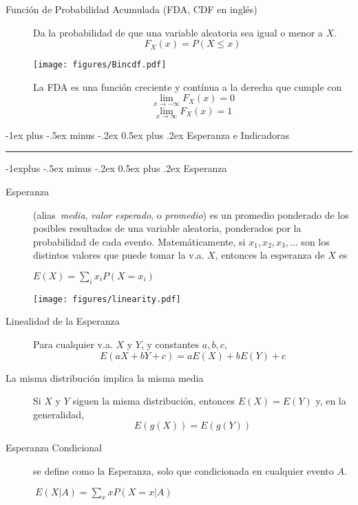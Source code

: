 \documentclass[12,landscape]{article}
\makeatletter
\renewcommand{\section}{\@startsection{section}{1}{0mm}%
                                {-1ex plus -.5ex minus -.2ex}%
                                {0.5ex plus .2ex}%
                                {\normalfont\large\bfseries}}
\renewcommand{\subsection}{\@startsection{subsection}{2}{0mm}%
                                {-1explus -.5ex minus -.2ex}%
                                {0.5ex plus .2ex}%
                                {\normalfont\normalsize\bfseries}}
\makeatother
\begin{document}
\begin{multicols*}{3}
\begin{description}
\item[Función de Probabilidad Acumulada (FDA, CDF en inglés)] 
Da la probabilidad de que una variable aleatoria sea igual o menor a $X.$
\[F_X(x) = P(X \leq x)\]
\begin{minipage}{\linewidth}
            \centering
\texttt{[image: figures/Bincdf.pdf]}
        \end{minipage}

La FDA es una función creciente y contínua a la derecha que cumple con
\[\lim_{x\to -\infty} {F_X(x)} = 0\]
\[\lim_{x \to \infty} F_X(x) = 1\]

\end{description}

\section{Esperanza e Indicadoras}\smallskip \hrule height 2pt \smallskip


\subsection{Esperanza}
\begin{description}
\item[Esperanza] (alias~\emph{media}, \emph{valor esperado}, o \emph{promedio}) es un promedio ponderado de los posibles resultados de una variable aleatoria, ponderados por la probabilidad de cada evento. Matemáticamente, si $x_1, x_2, x_3, \dots$ son los distintos valores que puede tomar la v.a. $X$, entonces la esperanza de $X$ es
\begin{center}
$E(X) = \sum\limits_{i}x_iP(X=x_i)$
\end{center}

\begin{minipage}{\linewidth}
            \centering
\texttt{[image: figures/linearity.pdf]}
        \end{minipage}


\item[Linealidad de la Esperanza] Para cualquier v.a. $X$ y $Y$, y constantes $a,b,c,$ 
\[E(aX + bY + c) = aE(X) + bE(Y) + c \]

\item[La misma distribución implica la misma media] Si $X$ y $Y$ siguen la misma distribución, entonces $E(X)=E(Y)$ y, en la generalidad, 
$$E(g(X)) = E(g(Y))$$


\item[Esperanza Condicional] se define como la Esperanza, solo que condicionada en cualquier evento $A$. \begin{center}
$\ E(X | A) = \sum\limits_{x}xP(X=x | A)$
\end{center}


\end{description}
\end{multicols*}
\end{document}
